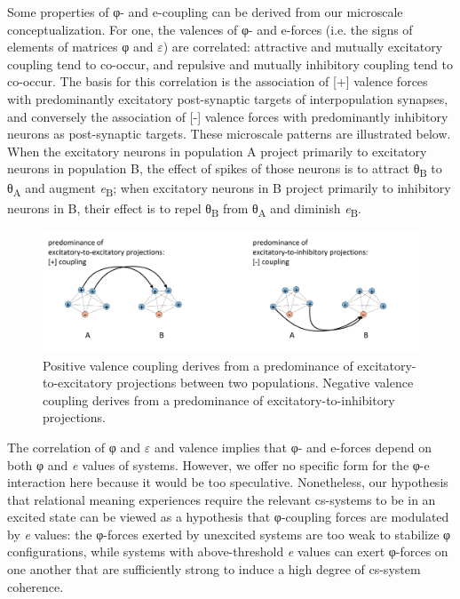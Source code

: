 

  Some properties of φ- and e-coupling can be derived from our microscale conceptualization. For one, the valences of φ- and e-forces (i.e. the signs of elements of matrices φ and $\varepsilon $) are correlated: attractive and mutually excitatory coupling tend to co-occur, and repulsive and mutually inhibitory coupling tend to co-occur. The basis for this correlation is the association of [+] valence forces with predominantly excitatory post-synaptic targets of interpopulation synapses, and conversely the association of [-] valence forces with predominantly inhibitory neurons as post-synaptic targets. These microscale patterns are illustrated below. When the excitatory neurons in population A project primarily to excitatory neurons in population B, the effect of spikes of those neurons is to attract θ\textsubscript{B} to θ\textsubscript{A} and augment \textit{e}\textsubscript{B}; when excitatory neurons in B project primarily to inhibitory neurons in B, their effect is to repel θ\textsubscript{B} from θ\textsubscript{A} and diminish \textit{e}\textsubscript{B}. 

  
\begin{figure}
\includegraphics[width=\textwidth]{figures/Tilsen-img21.png}
\caption{Positive valence coupling derives from a predominance of excitatory-to-excitatory projections between two populations. Negative valence coupling derives from a predominance of excitatory-to-inhibitory projections.}
\label{fig:2:14}
\end{figure}
 

  The correlation of φ and $\varepsilon $ and valence implies that φ- and e-forces depend on both φ and \textit{e} values of systems. However, we offer no specific form for the φ-e interaction here because it would be too speculative. Nonetheless, our hypothesis that relational meaning experiences require the relevant cs-systems to be in an excited state can be viewed as a hypothesis that φ-coupling forces are modulated by \textit{e} values: the φ-forces exerted by unexcited systems are too weak to stabilize φ configurations, while systems with above-threshold \textit{e} values can exert φ-forces on one another that are sufficiently strong to induce a high degree of cs-system coherence.

